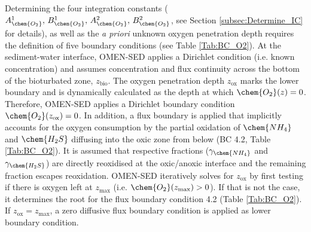 \documentclass[gmd, manuscript]{copernicus}
\begin{document}
Determining the four integration constants ($A_{\chem{O_2}}^1,\, B_{\chem{O_2}}^1,\, A_{\chem{O_2}}^2,\, B_{\chem{O_2}}^2$, see Section \ref{subsec:Determine_IC} for details), as well as the \textit{a priori} unknown oxygen penetration 
depth requires the definition of five boundary conditions (see Table \ref{Tab:BC_O2}). 
At the sediment-water interface, OMEN-SED applies a Dirichlet condition (i.e. known concentration) and assumes concentration and flux continuity across the bottom of the bioturbated zone, $z_{\mathrm{bio}}$. 
The oxygen penetration depth $z_{\mathrm{ox}}$ marks the lower boundary and is dynamically calculated as the depth at which $\chem{O_2}(z)=0$. 
Therefore, OMEN-SED applies a Dirichlet boundary condition $\chem{O_2}(z_{\mathrm{ox}})=0$. In addition, a flux boundary is applied that implicitly accounts for the oxygen consumption by the partial oxidation 
of $\chem{NH_4}$ and $\chem{H_2S}$ diffusing into the oxic zone from below (BC 4.2, Table \ref{Tab:BC_O2}). It is assumed that respective fractions ($\gamma_{\chem{NH_4}}$ and $\gamma_{\chem{H_2S}}$) are directly reoxidised 
at the oxic/anoxic interface and the remaining fraction escapes reoxidation. OMEN-SED iteratively solves for $z_{\mathrm{ox}}$ by first testing if there is oxygen left at $z_\mathrm{max}$ (i.e. $\chem{O_2}(z_\mathrm{max}) > 0$). If that is not the case, it determines the root for the flux 
boundary condition 4.2 (Table \ref{Tab:BC_O2}). If $z_{\mathrm{ox}}=z_\mathrm{max}$,  a zero diffusive flux boundary condition is applied as lower boundary condition. 
\end{document}
